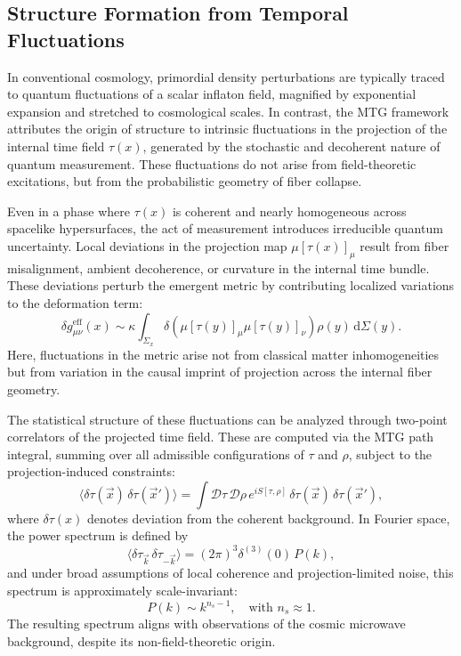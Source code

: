 \documentclass[11pt]{article}
\begin{document}
\subsection{Structure Formation from Temporal Fluctuations}

In conventional cosmology, primordial density perturbations are typically traced to quantum fluctuations of a scalar inflaton field, magnified by exponential expansion and stretched to cosmological scales. In contrast, the MTG framework attributes the origin of structure to intrinsic fluctuations in the projection of the internal time field \( \tau(x) \), generated by the stochastic and decoherent nature of quantum measurement. These fluctuations do not arise from field-theoretic excitations, but from the probabilistic geometry of fiber collapse.

Even in a phase where \( \tau(x) \) is coherent and nearly homogeneous across spacelike hypersurfaces, the act of measurement introduces irreducible quantum uncertainty. Local deviations in the projection map \( \mu[\tau(x)]_\mu \) result from fiber misalignment, ambient decoherence, or curvature in the internal time bundle. These deviations perturb the emergent metric by contributing localized variations to the deformation term:
\begin{equation}
\delta g^{\mathrm{eff}}_{\mu\nu}(x) \sim \kappa \int_{\Sigma_x} \delta\left( \mu[\tau(y)]_\mu \mu[\tau(y)]_\nu \right) \rho(y) \, \mathrm{d}\Sigma(y).
\end{equation}
Here, fluctuations in the metric arise not from classical matter inhomogeneities but from variation in the causal imprint of projection across the internal fiber geometry.

The statistical structure of these fluctuations can be analyzed through two-point correlators of the projected time field. These are computed via the MTG path integral, summing over all admissible configurations of \( \tau \) and \( \rho \), subject to the projection-induced constraints:
\begin{equation}
\langle \delta \tau(\vec{x}) \, \delta \tau(\vec{x}') \rangle = \int \mathcal{D}\tau \, \mathcal{D}\rho \, e^{i S[\tau, \rho]} \, \delta \tau(\vec{x}) \, \delta \tau(\vec{x}'),
\end{equation}
where \( \delta \tau(x) \) denotes deviation from the coherent background. In Fourier space, the power spectrum is defined by
\begin{equation}
\langle \delta \tau_{\vec{k}} \, \delta \tau_{-\vec{k}} \rangle = (2\pi)^3 \delta^{(3)}(0) \, P(k),
\end{equation}
and under broad assumptions of local coherence and projection-limited noise, this spectrum is approximately scale-invariant:
\begin{equation}
P(k) \sim k^{n_s - 1}, \quad \text{with } n_s \approx 1.
\end{equation}
The resulting spectrum aligns with observations of the cosmic microwave background, despite its non-field-theoretic origin.
\end{document}
